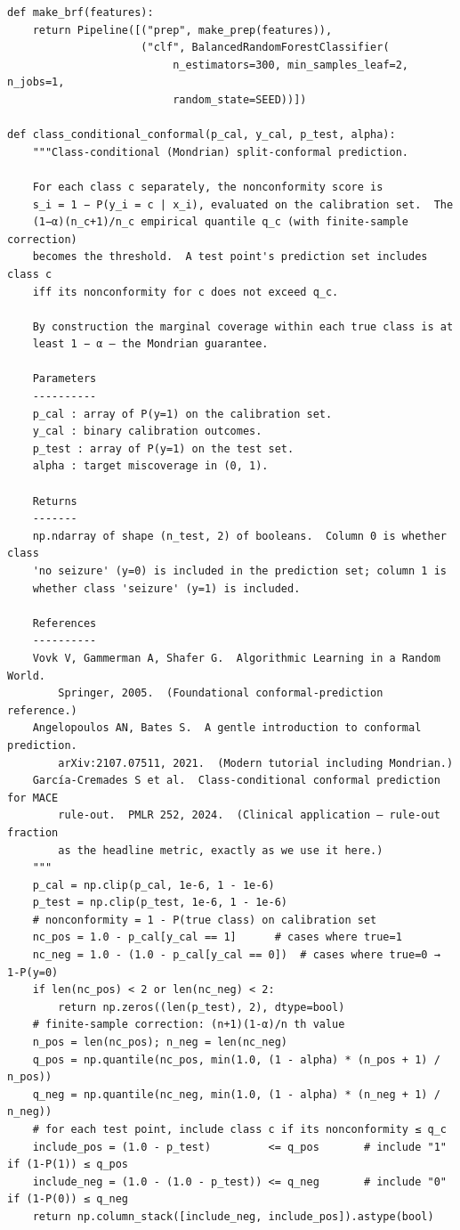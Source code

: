 \documentclass[11pt,a4paper]{article}
\begin{document}
\begin{lstlisting}[style=codeblock]
def make_brf(features):
    return Pipeline([("prep", make_prep(features)),
                     ("clf", BalancedRandomForestClassifier(
                          n_estimators=300, min_samples_leaf=2, n_jobs=1,
                          random_state=SEED))])

def class_conditional_conformal(p_cal, y_cal, p_test, alpha):
    """Class-conditional (Mondrian) split-conformal prediction.

    For each class c separately, the nonconformity score is
    s_i = 1 − P(y_i = c | x_i), evaluated on the calibration set.  The
    (1−α)(n_c+1)/n_c empirical quantile q_c (with finite-sample correction)
    becomes the threshold.  A test point's prediction set includes class c
    iff its nonconformity for c does not exceed q_c.

    By construction the marginal coverage within each true class is at
    least 1 − α — the Mondrian guarantee.

    Parameters
    ----------
    p_cal : array of P(y=1) on the calibration set.
    y_cal : binary calibration outcomes.
    p_test : array of P(y=1) on the test set.
    alpha : target miscoverage in (0, 1).

    Returns
    -------
    np.ndarray of shape (n_test, 2) of booleans.  Column 0 is whether class
    'no seizure' (y=0) is included in the prediction set; column 1 is
    whether class 'seizure' (y=1) is included.

    References
    ----------
    Vovk V, Gammerman A, Shafer G.  Algorithmic Learning in a Random World.
        Springer, 2005.  (Foundational conformal-prediction reference.)
    Angelopoulos AN, Bates S.  A gentle introduction to conformal prediction.
        arXiv:2107.07511, 2021.  (Modern tutorial including Mondrian.)
    García-Cremades S et al.  Class-conditional conformal prediction for MACE
        rule-out.  PMLR 252, 2024.  (Clinical application — rule-out fraction
        as the headline metric, exactly as we use it here.)
    """
    p_cal = np.clip(p_cal, 1e-6, 1 - 1e-6)
    p_test = np.clip(p_test, 1e-6, 1 - 1e-6)
    # nonconformity = 1 - P(true class) on calibration set
    nc_pos = 1.0 - p_cal[y_cal == 1]      # cases where true=1
    nc_neg = 1.0 - (1.0 - p_cal[y_cal == 0])  # cases where true=0 → 1-P(y=0)
    if len(nc_pos) < 2 or len(nc_neg) < 2:
        return np.zeros((len(p_test), 2), dtype=bool)
    # finite-sample correction: (n+1)(1-α)/n th value
    n_pos = len(nc_pos); n_neg = len(nc_neg)
    q_pos = np.quantile(nc_pos, min(1.0, (1 - alpha) * (n_pos + 1) / n_pos))
    q_neg = np.quantile(nc_neg, min(1.0, (1 - alpha) * (n_neg + 1) / n_neg))
    # for each test point, include class c if its nonconformity ≤ q_c
    include_pos = (1.0 - p_test)         <= q_pos       # include "1" if (1-P(1)) ≤ q_pos
    include_neg = (1.0 - (1.0 - p_test)) <= q_neg       # include "0" if (1-P(0)) ≤ q_neg
    return np.column_stack([include_neg, include_pos]).astype(bool)



\end{lstlisting}
\end{document}
